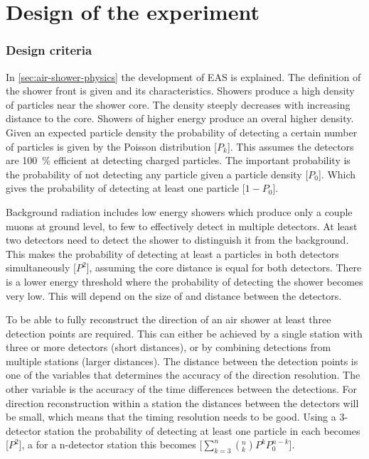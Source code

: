 \chapter{Design of the \hisparc experiment}
\label{ch:experiment}

\subsection{Design criteria}

In \cref{sec:air-shower-physics} the development of EAS is explained. The definition of the shower front is given and its characteristics. Showers produce a high density of particles near the shower core. The density steeply decreases with increasing distance to the core. Showers of higher energy produce an overal higher density. Given an expected particle density the probability of detecting a certain number of particles is given by the Poisson distribution [$P_k$]. This assumes the detectors are \SI{100}{\percent} efficient at detecting charged particles. The important probability is the probability of not detecting any particle given a particle density [$P_0$]. Which gives the probability of detecting at least one particle [$1-P_0$].

Background radiation includes low energy showers which produce only a couple muons at ground level, to few to effectively detect in multiple detectors. At least two detectors need to detect the shower to distinguish it from the background. This makes the probability of detecting at least a particles in both detectors simultaneously [$P^2$], assuming the core distance is equal for both detectors. There is a lower energy threshold where the probability of detecting the shower becomes very low. This will depend on the size of and distance between the detectors.

To be able to fully reconstruct the direction of an air shower at least three detection points are required. This can either be achieved by a single station with three or more detectors (short distances), or by combining detections from multiple stations (larger distances). The distance between the detection points is one of the variables that determines the accuracy of the direction resolution. The other variable is the accuracy of the time differences between the detections. For direction reconstruction within a station the distances between the detectors will be small, which means that the timing resolution needs to be good. Using a 3-detector station the probability of detecting at least one particle in each becomes [$P^2$], a for a n-detector station this becomes [$\sum_{k=3}^{n} (^n_k) P^k P_0^{n-k}$].

